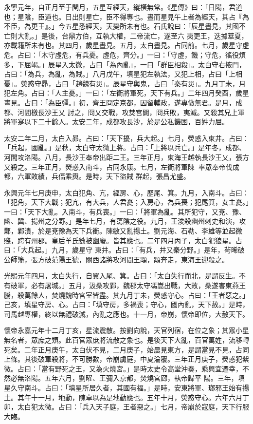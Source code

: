 \begin{pinyinscope}
 永寧元年，自正月至于閏月，五星互經天，縱橫無常。《星傳》曰：「日陽，君道也；星陰，臣道也。日出則星亡，臣不得專也。晝而星見午上者為經天，其占『為不臣，為更王』。」今五星悉經天，天變所未有也。石氏說曰：「辰星晝見，其國不亡則大亂。」是後，台鼎方伯，互執大權，二帝流亡，遂至六
 夷更王，迭據華夏，亦載籍所未有也。其四月，歲星晝見。五月，太白晝見。占同前。七月，歲星守虛危。占曰：「木守虛危，有兵憂。虛危，齊分。」一曰：「守虛，饑；守危，徭役煩多，下屈竭。」辰星入太微，占曰「為內亂」，一曰「群臣相殺」。太白守右掖門，占曰：「為兵，為亂，為賊。」八月戊午，填星犯左執法，又犯上相，占曰「上相憂」。熒惑守昴，占曰「趙魏有災」。辰星守輿鬼，占曰「秦有災」。九月丁未，月犯左角。占曰：「人主憂。」一曰：「左衛將軍死，天下有兵。」二年四月癸酉，歲星晝見。占曰：「為臣彊。」初，齊王冏定京都，因留輔政，遂專慠無君。是月，成都、河間檄長沙王乂
 討之，冏乂交戰，攻焚宮闕，冏兵敗，夷滅。又殺其兄上軍將軍寔以下二十餘人。太安二年，成都攻長沙，於是公私饑困，百姓力屈。



 太安二年二月，太白入昴。占曰：「天下擾，兵大起。」七月，熒惑入東井。占曰：「兵起，國亂。」是秋，太白守太微上將。占曰：「上將以兵亡。」是年冬，成都、河間攻洛陽。八月，長沙王奉帝出距二王。三年正月，東海王越執長沙王乂，張方又殺之。三年正月，熒惑入南斗，占同永康。七月，左衛將軍陳率眾奉帝伐成都，六軍敗績，兵偪乘輿。是時，天下盜賊
 群起，張昌尤盛。



 永興元年七月庚申，太白犯角、亢，經房、心，歷尾、箕。九月，入南斗。占曰：「犯角，天下大戰；犯亢，有大兵，人君憂；入房心，為兵喪；犯尾箕，女主憂。」一曰：「天下大亂。入南斗，有兵喪。」一曰：「將軍為亂。其所犯守，又兗、豫、幽、冀、揚州之分野。」是年七月，有蕩陰之役。九月，王浚殺幽州刺史和演，攻鄴，鄴潰，於是兗豫為天下兵衝。陳敏又亂揚土。劉元海、石勒、李雄等並起微賤，跨有州郡。皇后羊氏數被幽廢。皆其應也。二年四月丙子，太白犯狼星。占曰：「大兵起。」九月，歲星守
 東井。占曰：「有兵，井又秦分野。」是年，茍晞破公師籓，張方破范陽王猇，關西諸將攻河間王顒，顒奔走，東海王迎殺之。



 光熙元年四月，太白失行，自翼入尾、箕。占曰：「太白失行而北，是謂反生。不有破軍，必有屠城。」五月，汲桑攻鄴，魏郡太守馮嵩出戰，大敗，桑遂害東燕王騰，殺萬餘人，焚燒魏時宮室皆盡。其九月丁未，熒惑守心。占曰：「王者惡之。」己亥，填星守房、心。占曰：「填守房，多禍喪；守心，國內亂，天下赦。」是時，司馬越專權，終以無禮破滅，內亂之應也。十一月，帝崩，懷帝即位，大赦天下。



 懷帝永嘉元年十二月丁亥，星流震散。按劉向說，天官列宿，在位之象；其眾小星無名者，眾庶之類。此百官眾庶將流散之象也。是後天下大亂，百官萬姓，流移轉死矣。二年正月庚午，太白伏不見，二月庚子，始晨見東方，是謂當見不見，占同上條。其後破軍殺將，不可勝數，帝崩虜庭，中夏淪覆。三年正月庚子，熒惑犯紫微。占曰：「當有野死之王，又為火燒宮。」是時太史令高堂沖奏，乘興宜遷幸，不然必無洛陽。五年六月，劉曜、王彌入京都，焚燒宮廊，執帝歸平
 陽。三年，填星久守南斗。占曰：「填星所居久者，其國有福。」是時，安東將軍、瑯邪王始有揚土。其年十一月，地動，陳卓以為是地動應也。五年十月，熒惑守心。六年六月丁卯，太白犯太微。占曰：「兵入天子庭，王者惡之。」七月，帝崩於寇庭，天下行服大臨。




\end{pinyinscope}
